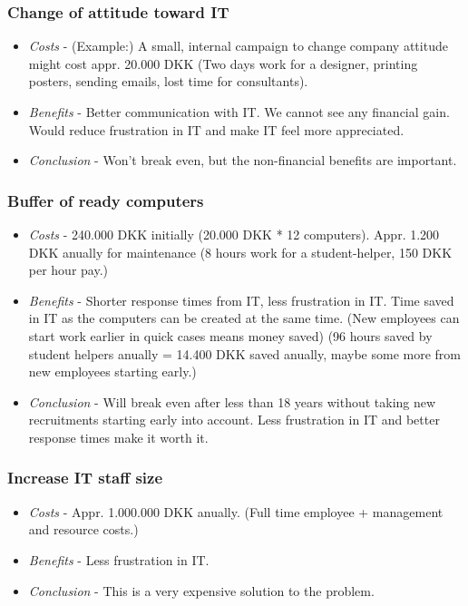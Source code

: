 \subsubsection{Change of attitude toward IT}
\begin{itemize}
\item \emph{Costs} - (Example:) A small, internal campaign to change company attitude might cost appr. 20.000 DKK (Two days work for a designer, printing posters, sending emails, lost time for consultants).
\item \emph{Benefits} - Better communication with IT. We cannot see any financial gain. Would reduce frustration in IT and make IT feel more appreciated.
\item \emph{Conclusion} - Won't break even, but the non-financial benefits are important.
\end{itemize}

\subsubsection{Buffer of ready computers}
\begin{itemize}
	\item \emph{Costs} - 240.000 DKK initially (20.000 DKK * 12 computers). Appr. 1.200 DKK anually for maintenance (8 hours work for a student-helper, 150 DKK per hour pay.)
	\item \emph{Benefits} - Shorter response times from IT, less frustration in IT. Time saved in IT as the computers can be created at the same time. (New employees can start work earlier in quick cases means money saved) (96 hours saved by student helpers anually = 14.400 DKK saved anually, maybe some more from new employees starting early.)
	\item \emph{Conclusion} - Will break even after less than 18 years without taking new recruitments starting early into account. Less frustration in IT and better response times make it worth it. 
\end{itemize}

\subsubsection{Increase IT staff size}
\begin{itemize}
	\item \emph{Costs} - Appr. 1.000.000 DKK anually. (Full time employee + management and resource costs.)
	\item \emph{Benefits} - Less frustration in IT.
	\item \emph{Conclusion} - This is a very expensive solution to the problem.
\end{itemize}

